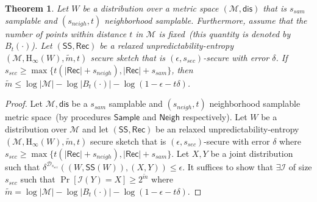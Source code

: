 \documentclass[11pt]{article}
\newcommand{\class}[1]{{\ensuremath{\mathsf{#1}}}}
\newcommand{\sketch}{\ensuremath{\class{SS}}\xspace}
\newcommand{\rec}{\ensuremath{\class{Rec}}\xspace}
\newcommand{\sample}{\ensuremath{\class{Sample}}\xspace}
\newcommand{\neigh}{\ensuremath{\class{Neigh}}\xspace}
\newcommand{\dis}{\ensuremath{\mathsf{dis}}}
\newcommand{\Hoo}{\mathrm{H}_\infty}
\newtheorem{theorem}{Theorem}[section]
\begin{document}
\begin{theorem}
Let $W$ be a distribution over a metric space $(\mathcal{M}, \dis)$ that is $s_{sam}$ samplable and $(s_{neigh}, t)$ neighborhood samplable.  Furthermore, assume that the number of points within distance $t$ in $\mathcal{M}$ is fixed~(this quantity is denoted by $B_t(\cdot)$).  Let $(\sketch, \rec)$ be a relaxed unpredictability-entropy $(\mathcal{M}, \Hoo(W), \tilde{m}, t)$ secure sketch that is $(\epsilon, s_{sec})$-secure with error $\delta$.  If $s_{sec} \geq \max\{ t(|\rec| +s_{neigh}), |\rec| + s_{sam}\}$, then $\tilde{m}\leq \log |\mathcal{M}| - \log |B_t(\cdot)| - \log(1-\epsilon -t\delta)$.
\end{theorem}
\begin{proof}
Let $\mathcal{M}, \dis$ be a $s_{sam}$ samplable and $(s_{neigh}, t)$ neighborhood samplable metric space~(by procedures $\sample$ and $\neigh$ respectively).  
Let $W$ be a distribution over $\mathcal{M}$ and let $(\sketch, \rec)$ be an relaxed unpredictability-entropy $(\mathcal{M}, \Hoo(W), \tilde{m}, t)$ secure sketch that is $(\epsilon, s_{sec})$-secure with error $\delta$ where $s_{sec} \geq \max\{ t(|\rec| +s_{neigh}), |\rec| + s_{sam}\}$.  Let $X, Y$ be a joint distribution such that $\delta^{\mathcal{D}_{s_{sec}}}((W, \sketch(W)), (X, Y))\leq \epsilon$.  It suffices to show that $\exists \mathcal{I}$ of size $s_{sec}$ such that $\Pr[\mathcal{I}(Y) = X]\geq 2^{\tilde{m}}$ where $\tilde{m} = \log |\mathcal{M}| - \log |B_t(\cdot)| - \log(1-\epsilon -t\delta)$.  


\end{proof}
\end{document}

